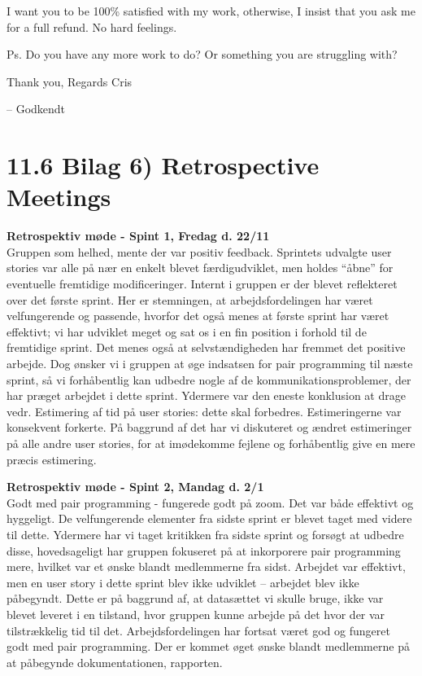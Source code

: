\documentclass[11pt]{report}
\begin{document}
\noindent I want you to be 100\% satisfied with my work, otherwise, I insist that you ask me for a full refund. No hard feelings.

\noindent Ps. Do you have any more work to do? Or something you are struggling with?

\noindent Thank you, Regards Cris

\noindent -- Godkendt


\newpage
\section*{11.6 Bilag 6) Retrospective Meetings}
\noindent\textbf{Retrospektiv møde - Spint 1, Fredag d. 22/11}\\
\noindent Gruppen som helhed, mente der var positiv feedback. Sprintets udvalgte user stories var alle på nær en enkelt blevet færdigudviklet, men holdes “åbne” for eventuelle fremtidige modificeringer. Internt i gruppen er der blevet reflekteret over det første sprint. Her er stemningen, at arbejdsfordelingen har været velfungerende og passende, hvorfor det også menes at første sprint har været effektivt; vi har udviklet meget og sat os i en fin position i forhold til de fremtidige sprint. Det menes også at selvstændigheden har fremmet det positive arbejde. Dog ønsker vi i gruppen at øge indsatsen for pair programming til næste sprint, så vi forhåbentlig kan udbedre nogle af de kommunikationsproblemer, der har præget arbejdet i dette sprint. Ydermere var den eneste konklusion at drage vedr. Estimering af tid på user stories: dette skal forbedres. Estimeringerne var konsekvent forkerte. På baggrund af det har vi diskuteret og ændret estimeringer på alle andre user stories, for at imødekomme fejlene og forhåbentlig give en mere præcis estimering.

\noindent\textbf{Retrospektiv møde - Spint 2, Mandag d. 2/1}\\
\noindent Godt med pair programming - fungerede godt på zoom. Det var både effektivt og hyggeligt. De velfungerende elementer fra sidste sprint er blevet taget med videre til dette. Ydermere har vi taget kritikken fra sidste sprint og forsøgt at udbedre disse, hovedsageligt har gruppen fokuseret på at inkorporere pair programming mere, hvilket var et ønske blandt medlemmerne fra sidst. Arbejdet var effektivt, men en user story i dette sprint blev ikke udviklet -- arbejdet blev ikke påbegyndt. Dette er på baggrund af, at datasættet vi skulle bruge, ikke var blevet leveret i en tilstand, hvor gruppen kunne arbejde på det hvor der var tilstrækkelig tid til det. Arbejdsfordelingen har fortsat været god og fungeret godt med pair programming. Der er kommet øget ønske blandt medlemmerne på at påbegynde dokumentationen, rapporten.
\end{document}
